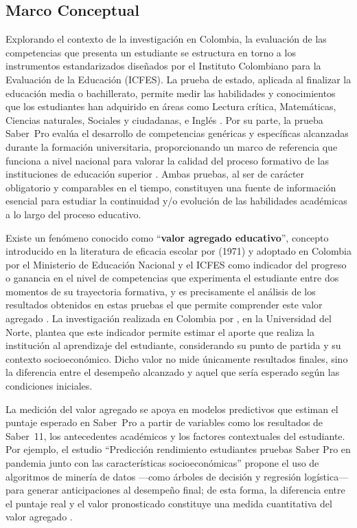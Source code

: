 \subsection{Marco Conceptual}

Explorando el contexto de la investigación en Colombia, la evaluación de las competencias que presenta un
estudiante se estructura en torno a los instrumentos estandarizados diseñados por el Instituto Colombiano
para la Evaluación de la Educación (ICFES). La prueba de estado, aplicada al finalizar la educación media
o bachillerato, permite medir las habilidades y conocimientos que los estudiantes han adquirido en áreas
como Lectura crítica, Matemáticas, Ciencias naturales, Sociales y ciudadanas, e Inglés \cite{icfes2024_informeSaber11_2023}. Por su
parte, la prueba Saber~Pro evalúa el desarrollo de competencias genéricas y específicas alcanzadas durante
la formación universitaria, proporcionando un marco de referencia que funciona a nivel nacional para valorar
la calidad del proceso formativo de las instituciones de educación superior \cite{sapiencia2022_infographicBestSaberPro}. Ambas pruebas, al ser
de carácter obligatorio y comparables en el tiempo, constituyen una fuente de información esencial para
estudiar la continuidad y/o evolución de las habilidades académicas a lo largo del proceso educativo.

Existe un fenómeno conocido como ``\textbf{valor agregado educativo}'', concepto introducido en la literatura de eficacia escolar por \cite{hanushek1971teacher} (1971) y adoptado en Colombia por el Ministerio de Educación Nacional y el ICFES como indicador del progreso o ganancia en el nivel de competencias que experimenta el estudiante entre dos momentos de su trayectoria formativa, y es precisamente el análisis de los resultados obtenidos en estas pruebas el que permite comprender este valor agregado \cite{icfes2021valoragregado}. La investigación realizada en Colombia por \cite{maestre2022_valorAgregadoCalidadEducativa}, en la Universidad del Norte, plantea que este indicador permite
estimar el aporte que realiza la institución al aprendizaje del estudiante, considerando su punto de partida
y su contexto socioeconómico. Dicho valor no mide únicamente resultados finales, sino la diferencia entre
el desempeño alcanzado y aquel que sería esperado según las condiciones iniciales.

La medición del valor agregado se apoya en modelos predictivos que estiman el puntaje esperado en
Saber~Pro a partir de variables como los resultados de Saber~11, los antecedentes académicos y los factores
contextuales del estudiante. Por ejemplo, el estudio ``Predicción rendimiento estudiantes pruebas Saber Pro
en pandemia junto con las características socioeconómicas'' propone el uso de algoritmos de minería de
datos ---como árboles de decisión y regresión logística--- para generar anticipaciones al desempeño final;
de esta forma, la diferencia entre el puntaje real y el valor pronosticado constituye una medida cuantitativa
del valor agregado \cite{vanegas2022_prediccionSaberPro}.

